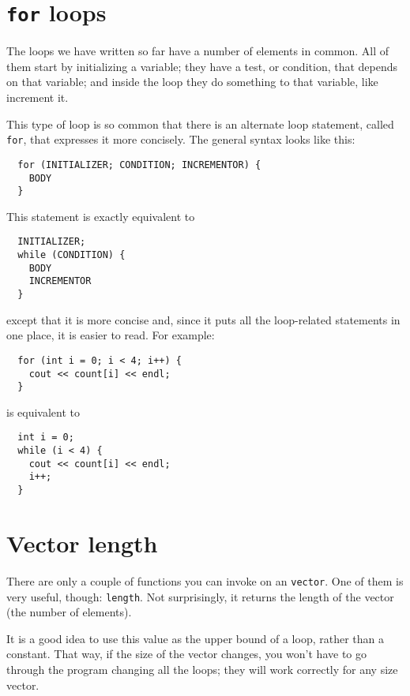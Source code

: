 \section{{\tt for} loops}

The loops we have written so far have a number of elements
in common.  All of them start by initializing a variable;
they have a test, or condition, that depends on that variable;
and inside the loop they do something to that variable,
like increment it.


This type of loop is so common that there is an alternate
loop statement, called {\tt for}, that expresses it more
concisely.  The general syntax looks like this:

\begin{verbatim}
  for (INITIALIZER; CONDITION; INCREMENTOR) {
    BODY
  }
\end{verbatim}
%
This statement is exactly equivalent to

\begin{verbatim}
  INITIALIZER;
  while (CONDITION) {
    BODY
    INCREMENTOR
  }
\end{verbatim}
%
except that it is more concise and, since it puts all the
loop-related statements in one place, it is easier to read.
For example:

\begin{verbatim}
  for (int i = 0; i < 4; i++) {
    cout << count[i] << endl;
  }
\end{verbatim}
%
is equivalent to 

\begin{verbatim}
  int i = 0;
  while (i < 4) {
    cout << count[i] << endl;
    i++;
  }
\end{verbatim}

\section{Vector length}

There are only a couple of functions you can invoke on an
{\tt vector}.  One of them is very useful, though: {\tt length}.
Not surprisingly, it returns the length of the vector (the number
of elements).

It is a good idea to use this value as the upper bound of a loop,
rather than a constant.  That way, if the size of the vector
changes, you won't have to go through the program changing all the
loops; they will work correctly for any size vector.


